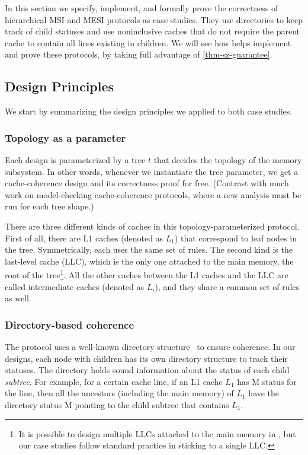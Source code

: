\documentclass[sigplan,10pt,review,anonymous,screen]{acmart}\settopmatter{printfolios=true,printccs=false,printacmref=false}
\begin{document}
In this section we specify, implement, and formally prove the correctness of hierarchical MSI and MESI protocols as case studies.
They use directories to keep track of child statuses and use noninclusive caches that do not require the parent cache to contain all lines existing in children.
We will see how \hemiola{} helps implement and prove these protocols, by taking full advantage of \autoref{thm-sz-guarantee}.

\subsection{Design Principles}
We start by summarizing the design principles we applied to both case studies.

\subsubsection{Topology as a parameter}
\label{sec-topo-param}
Each design is parameterized by a tree $t$ that decides the topology of the memory subsystem.
In other words, whenever we instantiate the tree parameter, we get a cache-coherence design and its correctness proof for free.
(Contrast with much work on model-checking cache-coherence protocols, where a new analysis must be run for each tree shape.)

There are three different kinds of caches in this topology-parameterized protocol.
First of all, there are L1 caches (denoted as $L_1$) that correspond to leaf nodes in the tree.
Symmetrically, each uses the same set of rules.
The second kind is the last-level cache (LLC), which is the only one attached to the main memory, the root of the tree\footnote{It is possible to design multiple LLCs attached to the main memory in \hemiola{}, but our case studies follow standard practice in sticking to a single LLC.}.
All the other caches between the L1 caches and the LLC are called intermediate caches (denoted as $L_i$), and they share a common set of rules as well.

\subsubsection{Directory-based coherence}

The protocol uses a well-known directory structure~\cite{Tang:1976} to ensure coherence.
In our designs, each node with children has its own directory structure to track their statuses.
The directory holds sound information about the status of each child \emph{subtree}.
For example, for a certain cache line, if an L1 cache $L_1$ has M status for the line, then all the ancestors (including the main memory) of $L_1$ have the directory status M pointing to the child subtree that contains $L_1$.
\end{document}

